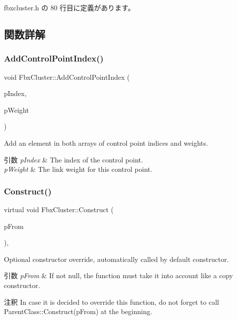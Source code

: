  fbxcluster.\+h の 80 行目に定義があります。



\subsection{関数詳解}
\mbox{\label{class_fbx_cluster_a877236816286cd8c5dcfa349ece9bee0}} 
\subsubsection{\texorpdfstring{Add\+Control\+Point\+Index()}{AddControlPointIndex()}}
{\footnotesize\ttfamily void Fbx\+Cluster\+::\+Add\+Control\+Point\+Index (\begin{DoxyParamCaption}\item[{int}]{p\+Index,  }\item[{double}]{p\+Weight }\end{DoxyParamCaption})}

Add an element in both arrays of control point indices and weights. 
\begin{DoxyParams}{引数}
{\em p\+Index} & The index of the control point. \\
\hline
{\em p\+Weight} & The link weight for this control point. \\
\hline
\end{DoxyParams}
\mbox{\label{class_fbx_cluster_a80619129929789d80930b2bbb524593c}} 
\subsubsection{\texorpdfstring{Construct()}{Construct()}}
{\footnotesize\ttfamily virtual void Fbx\+Cluster\+::\+Construct (\begin{DoxyParamCaption}\item[{const \hyperlink{class_fbx_object}{Fbx\+Object} $\ast$}]{p\+From }\end{DoxyParamCaption})\hspace{0.3cm}{\ttfamily [protected]}, {\ttfamily [virtual]}}

Optional constructor override, automatically called by default constructor. 
\begin{DoxyParams}{引数}
{\em p\+From} & If not null, the function must take it into account like a copy constructor. \\
\hline
\end{DoxyParams}
\begin{DoxyRemark}{注釈}
In case it is decided to override this function, do not forget to call Parent\+Class\+::\+Construct(p\+From) at the beginning. 
\end{DoxyRemark}


